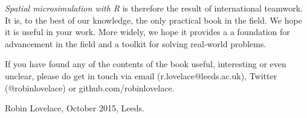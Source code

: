 

\emph{Spatial microsimulation with R} is therefore the
result of international teamwork.
It is, to the best of our knowledge, the only practical book in the
field. We hope it is useful in your work.
More widely, we hope it provides a
a foundation for advancement in the
field and a toolkit for solving real-world problems.

If you have found any of the contents of the book useful, interesting
or even unclear, please do get in touch via email (r.lovelace@leeds.ac.uk),
Twitter (@robinlovelace) or github.com/robinlovelace.

Robin Lovelace, October 2015, Leeds.




% 
% 
% 


